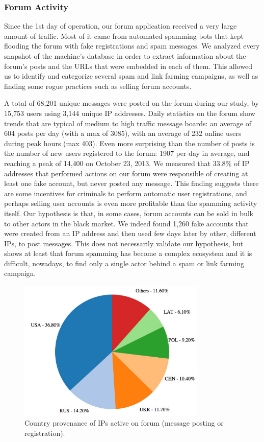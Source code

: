 \subsubsection{Forum Activity}

Since the 1st day of operation, our forum application received a very large amount of traffic. Most of it came from automated spamming bots that kept flooding the forum with fake registrations and spam messages. We analyzed every snapshot of the machine's database in order to extract information about the forum's posts and the URLs that were embedded in each of them. This allowed us to identify and categorize several spam and link farming campaigns, as well as finding some rogue practices such as selling forum accounts.

A total of 68,201 unique messages were posted on the forum during our study, by 15,753 users using 3,144 unique IP addresses. Daily statistics on the forum show trends that are typical of medium to high traffic message boards: an average of 604 posts per day (with a max of 3085), with an average of 232 online users during peak hours (max 403).
Even more surprising than the number of posts is the number of new users registered to the forum: 1907 per day in average, and reaching a peak of 14,400 on October 23, 2013. We measured that 33.8\% of IP addresses that performed actions on our forum were responsible of creating at least one fake account, but never posted any message. This finding suggests there are some incentives for criminals to perform automatic user registrations, and perhaps selling user accounts is even more profitable than the spamming activity itself. Our hypothesis is that, in some cases, forum accounts can be sold in bulk to other actors in the black market. We indeed found 1,260 fake accounts that were created from an IP address and then used few days later by other, different IPs, to post messages. This does not necessarily validate our hypothesis, but shows at least that forum spamming has become a complex ecosystem and it is difficult, nowadays, to find only a single actor behind a spam or link farming campaign.

\begin{figure}[tbh]
\centerline{\includegraphics[width=0.8\textwidth]{Images/spamCountriesIP.jpg}}
\caption{Country provenance of IPs active on forum (message posting or registration).\label{fig:spamCountriesIP}}
\end{figure}

